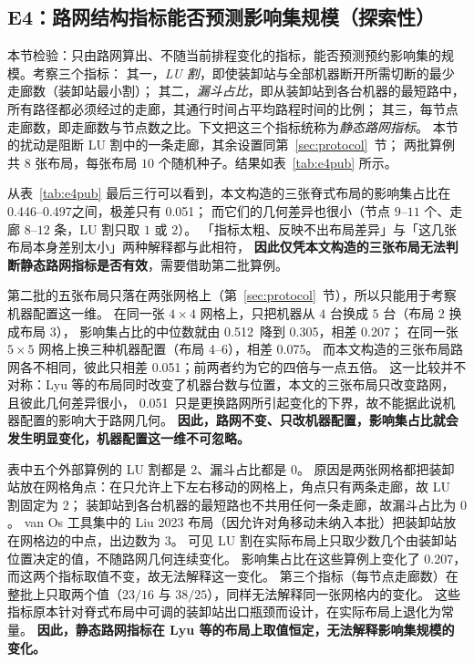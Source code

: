 \documentclass[manuscript,screen,review]{acmart}
\newcommand{\NSeeds}{10}
\newcommand{\PubCloLo}{0.305}
\newcommand{\PubCloHi}{0.512}
\newcommand{\PubCloSpread}{0.207}
\newcommand{\PubCloSpreadBig}{0.075}
\newcommand{\SelfCloLo}{0.446}
\newcommand{\SelfCloHi}{0.497}
\newcommand{\SelfCloSpread}{0.051}
\begin{document}
\subsection{E4：路网结构指标能否预测影响集规模（探索性）}
\label{sec:e4}

本节检验：只由路网算出、不随当前排程变化的指标，能否预测预约影响集的规模。考察三个指标：
其一，\emph{LU 割}，即使装卸站与全部机器断开所需切断的最少走廊数（装卸站最小割）；
其二，\emph{漏斗占比}，即从装卸站到各台机器的最短路中，所有路径都必须经过的走廊，其通行时间占平均路程时间的比例；
其三，每节点走廊数，即走廊数与节点数之比。下文把这三个指标统称为\emph{静态路网指标}。
本节的扰动是阻断 LU 割中的一条走廊，其余设置同第~\ref{sec:protocol}~节；
两批算例共 \(8\) 张布局，每张布局 \(\NSeeds\) 个随机种子。结果如表~\ref{tab:e4pub} 所示。

从表~\ref{tab:e4pub} 最后三行可以看到，本文构造的三张脊式布局的影响集占比在 \SelfCloLo--\SelfCloHi 之间，极差只有 \SelfCloSpread；
而它们的几何差异也很小（节点 \(9\)--\(11\) 个、走廊 \(8\)--\(12\) 条，LU 割只取 \(1\) 或 \(2\)）。
「指标太粗、反映不出布局差异」与「这几张布局本身差别太小」两种解释都与此相符，
\textbf{因此仅凭本文构造的三张布局无法判断静态路网指标是否有效}，需要借助第二批算例。

第二批的五张布局只落在两张网格上（第~\ref{sec:protocol}~节），所以只能用于考察机器配置这一维。
在同一张 \(4\times 4\) 网格上，只把机器从 \(4\) 台换成 \(5\) 台（布局 2 换成布局 3），
影响集占比的中位数就由 \PubCloHi\ 降到 \PubCloLo，相差 \PubCloSpread；
在同一张 \(5\times 5\) 网格上换三种机器配置（布局 4--6），相差 \PubCloSpreadBig。
而本文构造的三张布局路网各不相同，彼此只相差 \SelfCloSpread；前两者约为它的四倍与一点五倍。
这一比较并不对称：Lyu 等的布局同时改变了机器台数与位置，本文的三张布局只改变路网，且彼此几何差异很小，
\SelfCloSpread\ 只是更换路网所引起变化的下界，故不能据此说机器配置的影响大于路网几何。
\textbf{因此，路网不变、只改机器配置，影响集占比就会发生明显变化，机器配置这一维不可忽略。}

表中五个外部算例的 LU 割都是 \(2\)、漏斗占比都是 \(0\)。
原因是两张网格都把装卸站放在网格角点：在只允许上下左右移动的网格上，角点只有两条走廊，故 LU 割固定为 \(2\)；
装卸站到各台机器的最短路也不共用任何一条走廊，故漏斗占比为 \(0\)。
van Os 工具集中的 Liu 2023 布局（因允许对角移动未纳入本批）把装卸站放在网格边的中点，出边数为 \(3\)。
可见 LU 割在实际布局上只取少数几个由装卸站位置决定的值，不随路网几何连续变化。
影响集占比在这些算例上变化了 \PubCloSpread，而这两个指标取值不变，故无法解释这一变化。
第三个指标（每节点走廊数）在整批上只取两个值（\(23/16\) 与 \(38/25\)），同样无法解释同一张网格内的变化。
这些指标原本针对脊式布局中可调的装卸站出口瓶颈而设计，在实际布局上退化为常量。
\textbf{因此，静态路网指标在 Lyu 等的布局上取值恒定，无法解释影响集规模的变化。}
\end{document}
